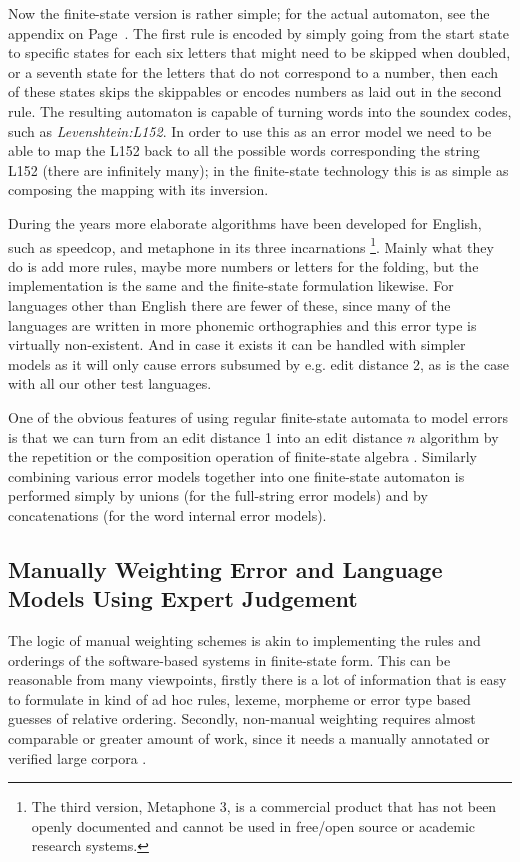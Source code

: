 \documentclass[a4paper,12pt]{article}
\begin{document}
Now the finite-state version is rather simple; for the actual automaton, see
the appendix on Page~\pageref{appendix:soundex}. The first rule is encoded by
simply going from the start state to specific states for each six letters that
might need to be skipped when doubled, or a seventh state for the letters that
do not correspond to a number, then each of these states skips the skippables
or encodes numbers as laid out in the second rule. The resulting automaton is
capable of turning words into the soundex codes, such as
\emph{Levenshtein:L152}. In order to use this as an error model we need to be
able to map the L152 back to all the possible words corresponding the string
L152 (there are infinitely many); in the finite-state technology this is as
simple as composing the mapping with its inversion.

During the years more elaborate algorithms have been developed for English,
such as speedcop, and metaphone in its three incarnations
\cite[]{philips1990hanging,philips2000double}\footnote{The third version,
    Metaphone 3, is a commercial product that has not been openly documented
and cannot be used in free/open source or academic research systems.}.  Mainly
what they do is add more rules, maybe more numbers or letters for the folding,
but the implementation is the same and the finite-state formulation likewise.
For languages other than English there are fewer of these, since many of the
languages are written in more phonemic orthographies and this error type is
virtually non-existent. And in case it exists it can be handled with simpler
models as it will only cause errors subsumed by e.g. edit distance 2, as is the
case with all our other test languages.

One of the obvious features of using regular finite-state automata to model
errors is that we can turn from an edit distance 1 into an edit distance $n$
algorithm by the repetition or the composition operation of finite-state
algebra \cite[]{pirinen2012effects}.  Similarly combining various error models
together into one finite-state automaton is performed simply by unions (for the
full-string error models) and by concatenations (for the word internal error
models).

\subsection{Manually Weighting Error and Language Models Using Expert
Judgement}
\label{subsec:manual-weighting}

The logic of manual weighting schemes is akin to implementing the rules and
orderings of the software-based systems in finite-state form. This can be
reasonable from many viewpoints, firstly there is a lot of information that
is easy to formulate in kind of ad hoc rules, lexeme, morpheme or error
type based guesses of relative ordering. Secondly, non-manual weighting
requires almost comparable or greater amount of work, since it needs a
manually annotated or verified large corpora .
\end{document}
